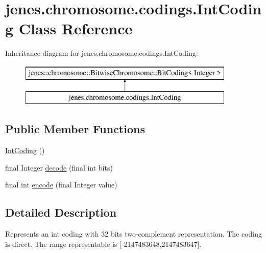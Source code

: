 \hypertarget{classjenes_1_1chromosome_1_1codings_1_1_int_coding}{\section{jenes.\-chromosome.\-codings.\-Int\-Coding Class Reference}
\label{classjenes_1_1chromosome_1_1codings_1_1_int_coding}
}
Inheritance diagram for jenes.\-chromosome.\-codings.\-Int\-Coding\-:\begin{figure}[H]
\begin{center}
\leavevmode
\includegraphics[height=2.000000cm]{classjenes_1_1chromosome_1_1codings_1_1_int_coding}
\end{center}
\end{figure}
\subsection*{Public Member Functions}
\begin{DoxyCompactItemize}
\item 
\hyperlink{classjenes_1_1chromosome_1_1codings_1_1_int_coding_af99166e5452fdf789dc235ce473872c9}{Int\-Coding} ()
\item 
final Integer \hyperlink{classjenes_1_1chromosome_1_1codings_1_1_int_coding_a2097eb05c6efc1572e07d23709f2f4f7}{decode} (final int bits)
\item 
final int \hyperlink{classjenes_1_1chromosome_1_1codings_1_1_int_coding_ab320730ca00ec9be8d2e7e52f3bdb8eb}{encode} (final Integer value)
\end{DoxyCompactItemize}


\subsection{Detailed Description}
Represents an int coding with 32 bits two-\/complement representation. The coding is direct. The range representable is \mbox{[}-\/2147483648,2147483647\mbox{]}.

